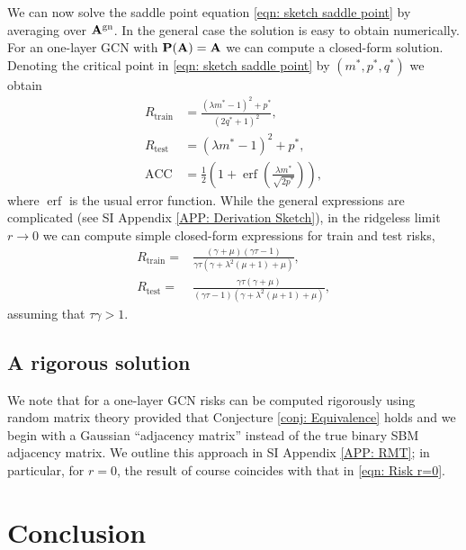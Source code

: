 \documentclass[9pt,twocolumn]{pnas-new}
\begin{document}
We can now solve the saddle point equation \eqref{eqn: sketch saddle point} by averaging over $\mathbf{A}^{\text{gn}}$. In the general case the solution is easy to obtain numerically. For an one-layer GCN with $\mathbf{P}(\mathbf{A}) = \mathbf{A}$ we can compute a closed-form solution.
Denoting the critical point in \eqref{eqn: sketch saddle point} by $(m^*,p^*,q^*)$ we obtain
\begin{equation}\label{eqn: Risk r>=0}
\begin{aligned}
R_\text{train}&=\frac{(\lambda  m^*-1)^2+p^*}{(2 q^*+1)^2},
\\ R_\text{test}&= (\lambda  m^*-1)^2+p^*, \\ \mathrm{ACC}&=\frac{1}{2}\left(1+\operatorname{erf}\left(\frac{\lambda m^*}{\sqrt{2p^*}}\right)\right),
\end{aligned}
\end{equation}
where $\operatorname{erf}$ is the usual error function. While the general expressions are complicated (see SI Appendix \ref{APP: Derivation Sketch}), in the ridgeless limit $r \to 0$  we can compute simple closed-form expressions for train and test risks,
\begin{equation}\label{eqn: Risk r=0}
\begin{aligned}
R_\text{train}=& \frac{(\gamma+\mu)(\gamma\tau-1)}{\gamma\tau\left(\gamma+\lambda^{2}(\mu+1)+\mu\right)},\\
R_\text{test}=&\frac{\gamma\tau(\gamma+\mu)}{(\gamma\tau-1)\left(\gamma+\lambda^{2}(\mu+1)+\mu\right)},
\end{aligned}
\end{equation}
assuming that $\tau\gamma>1$.

\subsection*{A rigorous solution}

We note that for a one-layer GCN risks can be computed rigorously using random matrix theory provided that Conjecture \ref{conj: Equivalence} holds and we begin with a Gaussian ``adjacency matrix'' instead of the true binary SBM adjacency matrix. We outline this approach in SI Appendix \ref{APP: RMT}; in particular, for $r = 0$, the result of course coincides with that in \eqref{eqn: Risk r=0}.

\section{Conclusion}
\label{sec:conclusion}
\end{document}
